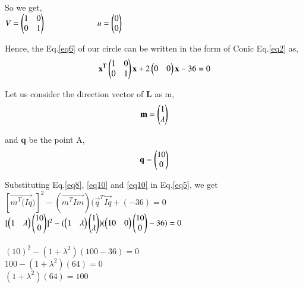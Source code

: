 \documentclass[journal,12pt,twocolumn]{IEEEtran}
\begin{document}
\vspace{0.25cm}
\raggedright
So we get,\\
\vspace{0.25cm}
\centering
$ V = \begin{pmatrix}1&0\\0&1\end{pmatrix} \hspace{2.2cm} u = \begin{pmatrix}0\\0\end{pmatrix} $ \\
\vspace{0.25cm}
\raggedright
Hence, the Eq.\eqref{eq6} of our circle can be written in the form of Conic Eq.\eqref{eq2} as,\\
\centering
\begin{align}
\mathbf{x^T} \begin{pmatrix}1&0\\0&1\end{pmatrix}\mathbf{x} + 2 \begin{pmatrix}0&0\end{pmatrix} \mathbf{x} - 36 = 0
\label{eq8}
\end{align} 
\raggedright
Let us consider the direction vector of \textbf{L} as m,\\
\centering
\begin{align}
\mathbf{m} = \begin{pmatrix}1\\ \lambda\end{pmatrix}
\label{eq9}
\end{align}
\raggedright
and \textbf{q} be the point A,\\
\centering
\begin{align}
\mathbf{q} = \begin{pmatrix}10\\0\end{pmatrix}
\label{eq10}
\end{align}
\vspace{0.5cm}
\raggedright
Substituting Eq.\eqref{eq8}, \eqref{eq10} and \eqref{eq10} in Eq.\eqref{eq5}, we get\\
\vspace{0.5cm}
\centering
$ [\vec{m^T(Iq})]^2 - (\vec{m^T Im}) (\vec{q}^T \vec{Iq} + (-36)  = 0$\\
\vspace{0.25cm}
$ [ \begin{pmatrix}1& \lambda\end{pmatrix} \begin{pmatrix}10\\0\end{pmatrix} ]^2 - ( \begin{pmatrix}1&\lambda\end{pmatrix}\begin{pmatrix}1\\\lambda\end{pmatrix} ) (\begin{pmatrix}10&0\end{pmatrix} \begin{pmatrix}10\\0\end{pmatrix} - 36 ) = 0$ \\
\hspace{8cm} \\ 
\vspace{0.25cm}
$ (10)^2 - ( 1 + \lambda^2 ) (100 - 36 ) = 0$\\
\vspace{0.25cm}
$ 100 - ( 1 + \lambda^2 ) ( 64 ) = 0 $\\
\vspace{0.25cm}
$ (1 + \lambda^2 ) (64 ) = 100 $\\
\end{document}

